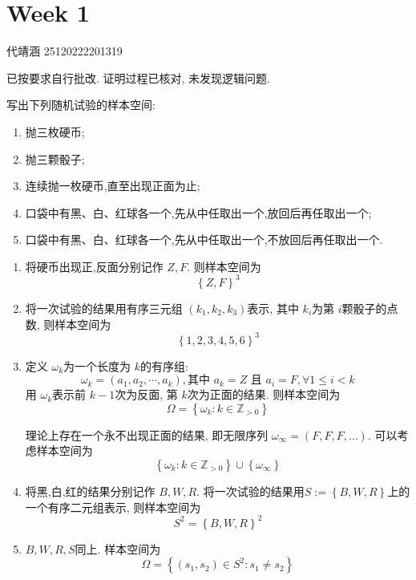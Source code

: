 \documentclass[../main.tex]{subfiles}
\begin{document}
\chapter{ Week 1 }

代靖涵 25120222201319


\begin{remark}
    已按要求自行批改. 证明过程已核对, 未发现逻辑问题.
\end{remark}
\begin{exercise}{}{}
写出下列随机试验的样本空间:
\begin{enumerate}
    \item 抛三枚硬币;
    \item 抛三颗骰子;
    \item 连续抛一枚硬币,直至出现正面为止;
    \item 口袋中有黑、白、红球各一个,先从中任取出一个,放回后再任取出一个;
    \item 口袋中有黑、白、红球各一个,先从中任取出一个,不放回后再任取出一个.
\end{enumerate}
\end{exercise}

\begin{solution}
    \begin{enumerate}
        \item 将硬币出现正,反面分别记作 \(  Z,F  \). 则样本空间为 \[
        \left\{ Z,F \right\}^{3}
        \] 
        \item 将一次试验的结果用有序三元组 \(  (k_1,k_2,k_3)  \)表示, 其中 \(  k_{i}  \)为第 \(  i  \)颗骰子的点数, 则样本空间为 \[
        \left\{ 1,2,3,4,5,6 \right\}^{3}
        \]   
        \item 定义 \(   \omega _{k}  \)为一个长度为 \(  k  \)的有序组: \[
         \omega _{k}= \left( a_1,a_2,\cdots ,a_{k} \right) ,\text{其中 } a_{k}= Z \text{ 且 } a_{i}= F , \forall 1\le i< k  
        \]  用 \(   \omega _{k}  \)表示前 \(  k-1  \)次为反面,  第 \(  k  \)次为正面的结果.  则样本空间为 \[
         \Omega = \left\{  \omega _{k}: k \in \mathbb{Z} _{> 0} \right\}
        \] 
        \begin{remark}
            理论上存在一个永不出现正面的结果, 即无限序列 $\omega_{\infty} = (F, F, F, \dots)$. 可以考虑样本空间为 \[
            \left\{  \omega _{k}:k\in \mathbb{Z} _{> 0} \right\}\cup \left\{  \omega _{\infty} \right\}
            \]
        \end{remark}
        \item 将黑,白,红的结果分别记作 \(  B,W,R  \). 将一次试验的结果用\( S:=  \left\{ B,W,R \right\}  \)上的一个有序二元组表示, 则样本空间为 \[
        S^{2}= \left\{ B,W,R \right\}^{2}
        \]  
        \item \(  B,W,R  ,S\)同上. 样本空间为 \[
         \Omega = \left\{ \left( s_1,s_2 \right)\in S^{2}:s_1\neq s_2  \right\}
        \] 
    \end{enumerate}
    
\end{solution}
\end{document}
